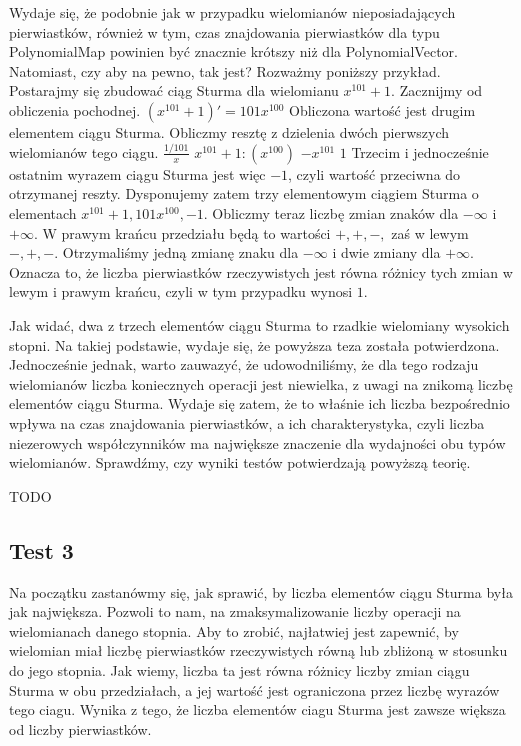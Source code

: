 \documentclass[oneside,a4paper]{book}
\begin{document}
	Wydaje się, że podobnie jak w przypadku wielomianów nieposiadających pierwiastków, również w tym, czas znajdowania pierwiastków dla typu PolynomialMap powinien być znacznie krótszy niż dla PolynomialVector. Natomiast, czy aby na pewno, tak jest? Rozważmy poniższy przykład.
	Postarajmy się zbudować ciąg Sturma dla wielomianu $x^{101}+1$. Zacznijmy od obliczenia pochodnej.
	$(x^{101}+1)'=101x^{100}$
	Obliczona wartość jest drugim elementem ciągu Sturma. Obliczmy resztę z dzielenia dwóch pierwszych wielomianów tego ciągu.
	$\frac{1/101}x$
	$x^{101}+1 : (x^{100})$
	$-x^{101}$
	$1$
	Trzecim i jednocześnie ostatnim wyrazem ciągu Sturma jest więc $-1$, czyli wartość przeciwna do otrzymanej reszty. Dysponujemy zatem trzy elementowym ciągiem Sturma o elementach ${x^{101}+1, 101x^{100}, -1}$. Obliczmy teraz liczbę zmian znaków dla $-\infty$ i $+\infty$. W prawym krańcu przedziału będą to wartości $+,+,-,$ zaś w lewym $-,+,-.$ Otrzymaliśmy jedną zmianę znaku dla $-\infty$ i dwie zmiany dla $+\infty$. Oznacza to, że liczba pierwiastków rzeczywistych jest równa różnicy tych zmian w lewym i prawym krańcu, czyli w tym przypadku wynosi $1$.
	
	Jak widać, dwa z trzech elementów ciągu Sturma to rzadkie wielomiany wysokich stopni. Na takiej podstawie, wydaje się, że powyższa teza została potwierdzona. Jednocześnie jednak, warto zauwazyć, że udowodniliśmy, że dla tego rodzaju wielomianów liczba koniecznych operacji jest niewielka, z uwagi na znikomą liczbę elementów ciągu Sturma. Wydaje się zatem, że to właśnie ich liczba bezpośrednio wpływa na czas znajdowania pierwiastków, a ich charakterystyka, czyli liczba niezerowych współczynników ma największe znaczenie dla wydajności obu typów wielomianów. Sprawdźmy, czy wyniki testów potwierdzają powyższą teorię.
	
	TODO
	
	\subsection{Test 3}
	
	Na początku zastanówmy się, jak sprawić, by liczba elementów ciągu Sturma była jak największa. Pozwoli to nam, na zmaksymalizowanie liczby operacji na wielomianach danego stopnia. Aby to zrobić, najłatwiej jest zapewnić, by wielomian miał liczbę pierwiastków rzeczywistych równą lub zbliżoną w stosunku do jego stopnia. Jak wiemy, liczba ta jest równa różnicy liczby zmian ciągu Sturma w obu przedziałach, a jej wartość jest ograniczona przez liczbę wyrazów tego ciagu. Wynika z tego, że liczba elementów ciagu Sturma jest zawsze większa od liczby pierwiastków.
	
\end{document}
